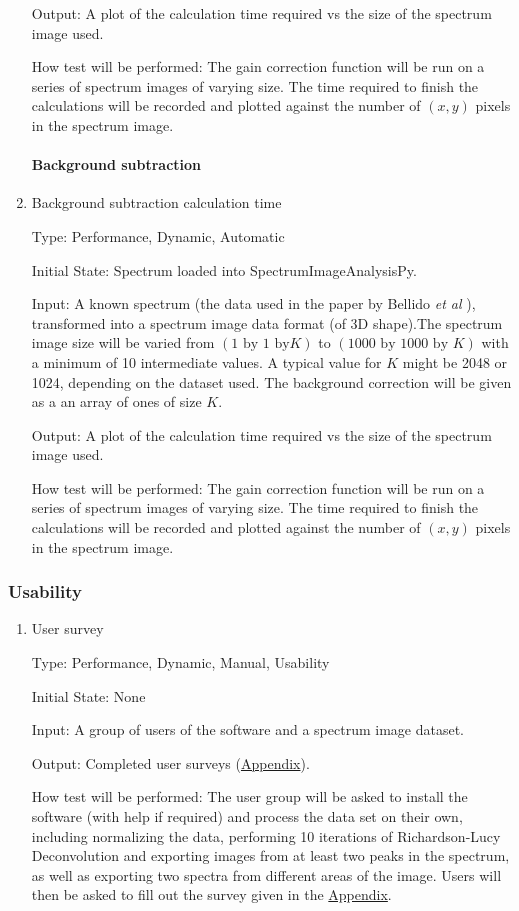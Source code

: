 \documentclass[12pt, titlepage]{article}
\newcommand{\progname}{SpectrumImageAnalysisPy}
\begin{document}
\begin{enumerate}
Output: A plot of the calculation time required vs the size of the spectrum
image used.

How test will be performed: The gain correction function will be run on a series
of spectrum images of varying size. The time required to finish the calculations
will be recorded and plotted against the number of $(x, y)$ pixels in the
spectrum image.\\

\paragraph{Background subtraction}
\item{Background subtraction calculation time}

Type: Performance, Dynamic, Automatic

Initial State: Spectrum loaded into \progname{}.

Input: A known spectrum (the data used in the paper by Bellido \textit{et al}
\cite{bellido_toward_2014}), transformed into a spectrum image data format (of
3D shape).The spectrum image size will be varied from $(1\text{ by }1\text{ by
}K)$ to $(1000 \text{ by } 1000 \text{ by }K)$ with a minimum of 10 intermediate
values. A typical value for $K$ might be 2048 or 1024, depending on the dataset
used. The background correction will be given as a an array of ones of size $K$.

Output: A plot of the calculation time required vs the size of the spectrum
image used.

How test will be performed: The gain correction function will be run on a series
of spectrum images of varying size. The time required to finish the calculations
will be recorded and plotted against the number of $(x, y)$ pixels in the
spectrum image.\\
\end{enumerate}

\subsubsection{Usability}
\begin{enumerate}
\item{User survey}

Type: Performance, Dynamic, Manual, Usability

Initial State: None

Input: A group of users of the software and a spectrum image dataset.

Output: Completed user surveys (\hyperref[App:UserSurv]{Appendix}).

How test will be performed: The user group will be asked to install the software
(with help if required) and process the data set on their own, including
normalizing the data, performing 10 iterations of Richardson-Lucy Deconvolution
and exporting images from at least two peaks in the spectrum, as well as
exporting two spectra from different areas of the image. Users will then be
asked to fill out the survey given in the \hyperref[App:UserSurv]{Appendix}.\\

\end{enumerate}
\end{document}
